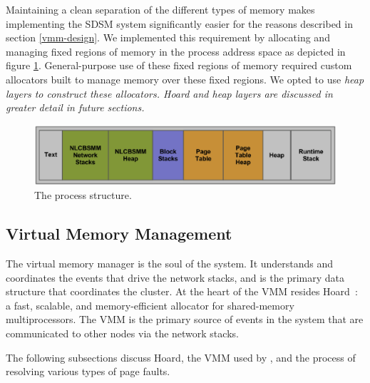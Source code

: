 Maintaining a clean separation of the different types of memory makes implementing the SDSM system significantly easier for the reasons described in section \ref{vmm-design}.  We implemented this requirement by allocating and managing fixed regions of memory in the process address space as depicted in figure \ref{process-structure}.  General-purpose use of these fixed regions of memory required custom allocators built to manage memory over these fixed regions.  We opted to use \em heap layers \em to construct these allocators.  Hoard and \em heap layers \em are discussed in greater detail in future sections.

\begin{figure}[t]
\centering
\includegraphics[scale=0.40]{images/process-structure.eps}
\caption{The \projname{} process structure.}
\label{process-structure}
\end{figure}

\subsection{Virtual Memory Management}
The virtual memory manager is the soul of the \projname{} system.  It understands and coordinates the events that drive the network stacks, and is the primary data structure that coordinates the cluster.  At the heart of the VMM resides Hoard~\cite{Berger:1999:HFS:899944, Berger:2000:HSM:356989.357000}: a fast, scalable, and memory-efficient allocator for shared-memory multiprocessors.  The VMM is the primary source of events in the system that are communicated to other nodes via the network stacks.

The following subsections discuss Hoard, the VMM used by \projname{}, and the process of resolving various types of page faults.

